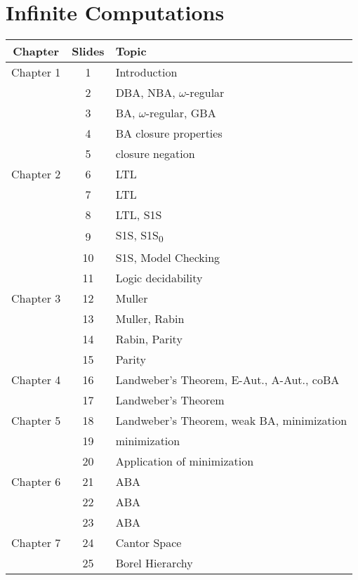 \documentclass{article}
\begin{document}
\section*{Infinite Computations}
\begin{tabular}{c|c|l}
	\textbf{Chapter} & \textbf{Slides} & \textbf{Topic} \\ \hline
	Chapter 1 & 1 & Introduction
	\\ \hline
	& 2 & DBA, NBA, $\omega$-regular
	\\ \hline
	& 3 & BA, $\omega$-regular, GBA
	\\ \hline
	& 4 & BA closure properties
	\\ \hline
	& 5 & closure negation
	\\ \hline
	Chapter 2 & 6 & LTL
	\\ \hline
	& 7 & LTL
	\\ \hline
	& 8 & LTL, S1S
	\\ \hline
	& 9 & S1S, S1S\textsubscript{0}
	\\ \hline
	& 10 & S1S, Model Checking
	\\ \hline
	& 11 & Logic decidability
	\\ \hline
	Chapter 3 & 12 & Muller
	\\ \hline
	& 13 & Muller, Rabin
	\\ \hline
	& 14 & Rabin, Parity
	\\ \hline
	& 15 & Parity
	\\ \hline
	Chapter 4 & 16 & Landweber's Theorem, E-Aut., A-Aut., coBA
	\\ \hline
	& 17 & Landweber's Theorem
	\\ \hline
	Chapter 5 & 18 & Landweber's Theorem, weak BA, minimization
	\\ \hline
	& 19 & minimization
	\\ \hline
	& 20 & Application of minimization
	\\ \hline
	Chapter 6 & 21 & ABA
	\\ \hline
	& 22 & ABA
	\\ \hline
	& 23 & ABA
	\\ \hline
	Chapter 7 & 24 & Cantor Space
	\\ \hline
	& 25 &  Borel Hierarchy
\end{tabular}
\newpage
\end{document}

